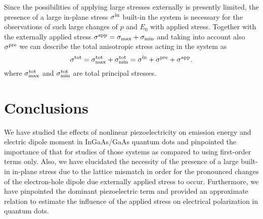 Since the possibilities of applying large stresses externally is presently limited, the presence of a large in-plane stress $\sigma^{\rm{in}}$ built-in the system is necessary for the observations of such large changes of $p$ and $E_0$ with applied stress. Together with the externally applied stress $\sigma^{\rm{app}}=\sigma_{\mathrm{max}}+\sigma_{\mathrm{min}}$ and taking into account also $\sigma^{\rm{pre}}$ we can describe the total anisotropic stress acting in the system as 
%
%
%
%
%
%
\begin{equation}
\label{eq:stressTot}
\sigma^{\rm{tot}} = \sigma^{\rm{tot}}_{\mathrm{max}}+\sigma^{\rm{tot}}_{\mathrm{min}} = \sigma^{\rm{in}} + \sigma^{\rm{pre}} + \sigma^{\rm{app}}.
\end{equation}
%
where $\sigma^{\rm{tot}}_{\mathrm{max}}$ and $\sigma^{\rm{tot}}_{\mathrm{min}}$ are total principal stresses.
%



\newpage

\section{Conclusions}
We have studied the effects of nonlinear piezoelectricity on emission energy and electric dipole moment in InGaAs/GaAs quantum dots and pinpointed the importance of that for studies of those systems as compared to using first-order terms only. Also, we have elucidated the necessity of the presence of a large built-in in-plane stress due to the lattice mismatch in order for the pronounced changes of the electron-hole dipole due externally applied stress to occur. Furthermore, we have pinpointed the dominant piezoelectric term and provided an approximate relation to estimate the influence of the applied stress on electrical polarization in quantum dots.


